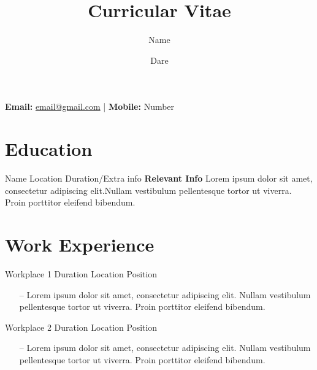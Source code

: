 \documentclass{cvlayout}
\title{Curricular Vitae}
\author{Name}
\date{Dare}
\begin{document}
\maketitle

\begin{center}
    \normalsize
    {\bfseries Email: }
    {\href{mailto:email@gmail.com}
    {email@gmail.com}} |
    {\bfseries Mobile: }{Number}
\end{center}


\begin{minipage}[t]{0.72\textwidth}

\section{Education}
\edentry
{Name}
{Location}
{Duration/Extra info}
{{\bfseries Relevant Info}  Lorem ipsum dolor sit amet, consectetur adipiscing elit.Nullam vestibulum pellentesque tortor ut viverra. Proin porttitor eleifend bibendum.}

\vspace{-15pt}

\section{Work Experience}

\workentry
{Workplace 1}
{Duration}
{Location}
{Position}

\vspace{-18pt}
\begin{itemize}
\setlength\itemsep{0em}
\item[--] Lorem ipsum dolor sit amet, consectetur adipiscing elit. Nullam vestibulum pellentesque tortor ut viverra. Proin porttitor eleifend bibendum.
\end{itemize}

\workentry
{Workplace 2}
{Duration}
{Location}
{Position}

\vspace{-18pt}
\begin{itemize}
\setlength\itemsep{0em}
\item[--] Lorem ipsum dolor sit amet, consectetur adipiscing elit. Nullam vestibulum pellentesque tortor ut viverra. Proin porttitor eleifend bibendum.
\end{itemize}


\end{minipage}
\end{document}
